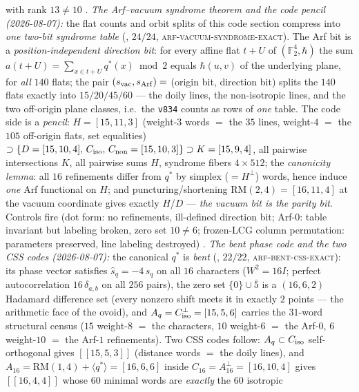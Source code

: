 \documentclass[11pt,a4paper]{article}
\theoremstyle{definition}
\begin{document}
\begin{keybox}
with rank $13 \ne 10$ \mE.
\emph{The Arf--vacuum syndrome theorem and the code pencil
(2026-08-07):} the flat counts and orbit splits of
this code section compress into \emph{one two-bit syndrome table}
(, $24/24$,
\textsc{arf-vacuum-syndrome-exact}).  The Arf bit is a
\emph{position-independent direction bit}: for every affine flat
$t{+}U$ of $(\mathbb{F}_2^4, \hbar)$ the sum $a(t{+}U) = \sum_{x \in t+U}
q^{*}(x) \bmod 2$ equals $\hbar(u, v)$ of the underlying plane,
for \emph{all} $140$ flats; the pair $(s_{\rm vac}, s_{\rm Arf})
=$ (origin bit, direction bit) splits the $140$ flats exactly
into $15/20/45/60$ --- the doily lines, the non-isotropic lines,
and the two off-origin plane classes, i.e.\ the \texttt{v834} counts as rows of \emph{one} table.  The code side is a \emph{pencil}:
$H = [15,11,3]$ (weight-$3$ words $=$ the $35$ lines,
weight-$4$ $=$ the $105$ off-origin flats, set equalities)
$\supset \{D = [15,10,4],\, C_{\rm iso},\, C_{\rm non} =
[15,10,3]\} \supset K = [15,9,4]$, all pairwise intersections
$K$, all pairwise sums $H$, syndrome fibers $4\times512$; the
\emph{canonicity lemma}: all $16$ refinements differ from
$q^{*}$ by simplex ($= H^{\perp}$) words, hence induce \emph{one}
Arf functional on $H$; and puncturing/shortening
$\mathrm{RM}(2,4) = [16,11,4]$ at the vacuum coordinate gives
exactly $H$/$D$ --- \emph{the vacuum bit is the parity bit}.
Controls fire (dot form: no refinements, ill-defined direction
bit; Arf-$0$: table invariant but labeling broken, zero set $10
\ne 6$; frozen-LCG column permutation: parameters preserved,
line labeling destroyed) \mE.
\emph{The bent phase code and the two CSS codes (2026-08-07):}
the canonical $q^{*}$ is \emph{bent}
(, $22/22$,
\textsc{arf-bent-css-exact}): its phase vector satisfies
$\hat s_q = -4\, s_q$ on all $16$ characters ($W^2 = 16I$;
perfect autocorrelation $16\,\delta_{a,b}$ on all $256$ pairs),
the zero set $\{0\} \cup \bar5$ is a $(16,6,2)$ Hadamard
difference set (every nonzero shift meets it in exactly $2$
points --- the arithmetic face of the ovoid), and $A_q =
C_{\rm iso}^{\perp} = [15,5,6]$ carries the $31$-word structural
census ($15$ weight-$8$ $=$ the characters, $10$ weight-$6$ $=$
the Arf-$0$, $6$ weight-$10$ $=$ the Arf-$1$ refinements).  Two
CSS codes follow: $A_q \subset C_{\rm iso}$ self-orthogonal
gives $[[15,5,3]]$ (distance words $=$ the doily lines), and
$A_{16} = \mathrm{RM}(1,4) + \langle q^{*}\rangle = [16,6,6]$
inside $C_{16} = A_{16}^{\perp} = [16,10,4]$ gives $[[16,4,4]]$
whose $60$ minimal words are \emph{exactly} the $60$ isotropic

\end{keybox}
\end{document}
